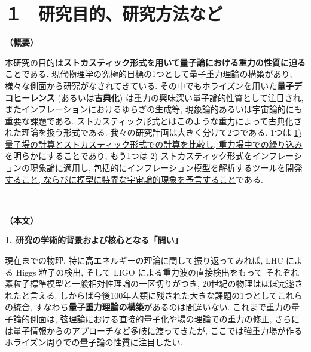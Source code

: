 \documentclass[11pt,a4j,dvipdfmx]{jarticle} 					%
\newcommand{\研究課題名}{\mgfamily\sffamily ストカスティック形式で迫る重力と量子論}
\newcommand{\研究機関名}{\mgfamily\sffamily 名古屋大学}
\newcommand{\研究代表者氏名}{\mgfamily\sffamily 多田祐一郎}
\newcommand{\研究期間の最終元号年度}{34}  %
\renewcommand{\emph}[1]{{\sffamily\gtfamily\bfseries #1}}
\begin{document}

\section{１　研究目的、研究方法など}

\noindent
\textbf{\mgfamily\sffamily（概要）}\\
	\mgfamily\sffamily
	
	本研究の目的は\emph{ストカスティック形式を用いて量子論における重力の性質に迫る}ことである. 
	現代物理学の究極的目標の1つとして量子重力理論の構築があり, 様々な側面から研究がなされてきている.
	その中でもホライズンを用いた\emph{量子デコヒーレンス} (あるいは\emph{古典化}) は重力の興味深い量子論的性質として注目され,
	またインフレーションにおけるゆらぎの生成等, 現象論的あるいは宇宙論的にも重要な課題である.
	ストカスティック形式とはこのような重力によって古典化された理論を扱う形式である.
	我々の研究計画は大きく分けて2つである. 1つは \ul{1) 量子場の計算とストカスティック形式での計算を比較し,
	重力場中での繰り込みを明らかにすること}であり, もう1つは \ul{2) ストカスティック形式をインフレーションの現象論に適用し,
	包括的にインフレーション模型を解析するツールを開発すること, ならびに模型に特異な宇宙論的現象を予言すること}である.
	
	\vspace*{13zw}	%

\noindent
\rule{\linewidth}{1pt}\\
\noindent
\textbf{（本文）}

\begin{mdframed}[roundcorner=0.5zw,
	innertopmargin=0.8zw,innerbottommargin=0.8zw,
	linecolor=black!50,linewidth=0.2zw,
	backgroundcolor=black!10]
	{\bfseries\gtfamily\sffamily\large 1. 研究の学術的背景および核心となる「問い」}
\end{mdframed}

現在までの物理, 特に高エネルギーの理論に関して振り返ってみれば, LHC による Higgs 粒子の検出, そして LIGO による重力波の直接検出をもって
それぞれ素粒子標準模型と一般相対性理論の一区切りがつき, 20世紀の物理はほぼ完遂されたと言える. 
しからば今後100年人類に残された大きな課題の1つとしてこれらの統合, すなわち\emph{量子重力理論の構築}があるのは間違いない.
これまで重力の量子論的側面は, 弦理論における直接的量子化や場の理論での重力の修正, さらには量子情報からのアプローチなど多岐に渡ってきたが,
ここでは強重力場が作るホライズン周りでの量子論の性質に注目したい.
\end{document}

